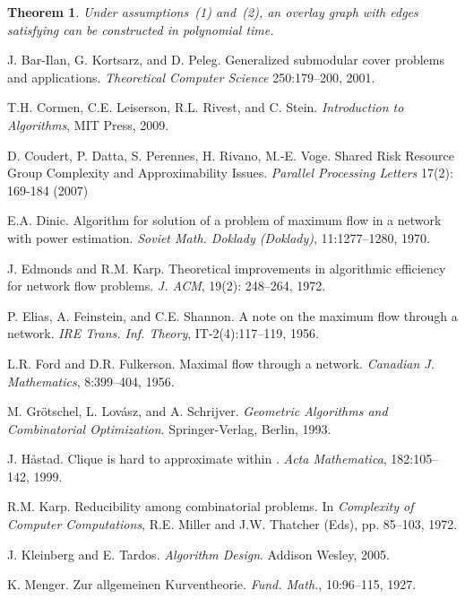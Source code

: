 \LongVersion \documentclass[11pt]{article}
\newtheorem{theorem}{Theorem}[section]
\theoremstyle{definition}
\theoremstyle{plain}
\begin{document}
\begin{theorem} \label{theorem:ConstructionSparseERDC}
Under assumptions~(1) and~(2), an overlay graph  with  edges
satisfying  can be constructed in polynomial time.
\end{theorem}

\newpage
\begin{thebibliography}{99}

J. Bar-Ilan, G. Kortsarz, and D. Peleg.
Generalized submodular cover problems and applications.
\emph{Theoretical Computer Science} 250:179--200, 2001.

T.H. Cormen, C.E. Leiserson, R.L. Rivest, and C. Stein.
\emph{Introduction to Algorithms}, MIT Press, 2009.

D. Coudert, P. Datta, S. Perennes, H. Rivano, M.-E. Voge.
Shared Risk Resource Group Complexity and Approximability Issues.
{\em Parallel Processing Letters} 17(2): 169-184 (2007)

E.A. Dinic.
Algorithm for solution of a problem of maximum flow in a network with power
estimation.
\emph{Soviet Math. Doklady (Doklady)}, 11:1277--1280, 1970.

J. Edmonds and R.M. Karp.
Theoretical improvements in algorithmic efficiency for network flow problems.
\emph{J. ACM}, 19(2): 248--264, 1972.

P. Elias, A. Feinstein, and C.E. Shannon.
A note on the maximum flow through a network.
\emph{IRE Trans. Inf. Theory}, IT-2(4):117--119, 1956.

L.R. Ford and D.R. Fulkerson.
Maximal flow through a network.
\emph{Canadian J. Mathematics}, 8:399--404, 1956.

M. Gr\"{o}tschel, L. Lov\'{a}sz, and A. Schrijver.
\emph{Geometric Algorithms and Combinatorial Optimization}.
Springer-Verlag, Berlin, 1993.

J. H{\aa}stad.
Clique is hard to approximate within .
\emph{Acta Mathematica}, 182:105--142, 1999.

R.M. Karp.
Reducibility among combinatorial problems.
In \emph{Complexity of Computer Computations}, R.E. Miller and J.W. Thatcher
(Eds), pp. 85--103, 1972.

J. Kleinberg and E. Tardos.
\emph{Algorithm Design}.
Addison Wesley, 2005.

K. Menger.
Zur allgemeinen Kurventheorie.
\emph{Fund. Math.}, 10:96--115, 1927.


\end{thebibliography}
\end{document}

